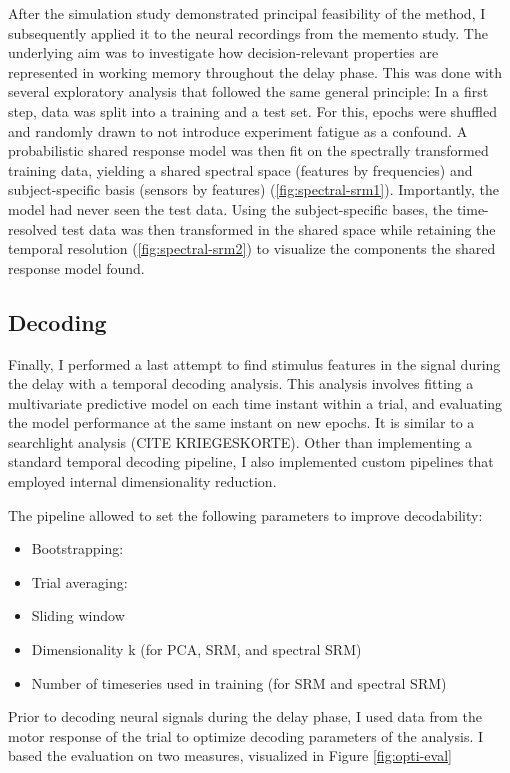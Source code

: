 After the simulation study demonstrated principal feasibility of the method, I subsequently applied it to the neural recordings from the memento study.
The underlying aim was to investigate how decision-relevant properties are represented in working memory throughout the delay phase.
This was done with several exploratory analysis that followed the same general principle:
In a first step, data was split into a training and a test set.
For this, epochs were shuffled and randomly drawn to not introduce experiment fatigue as a confound.
A probabilistic shared response model was then fit on the spectrally transformed training data, yielding a shared spectral space (features by frequencies) and subject-specific basis (sensors by features) (\ref{fig:spectral-srm1}).
Importantly, the model had never seen the test data.
Using the subject-specific bases, the time-resolved test data was then transformed in the shared space while retaining the temporal resolution (\ref{fig:spectral-srm2}) to visualize the components the shared response model found.

\subsection{Decoding}
\label{decoding-analysis}

Finally, I performed a last attempt to find stimulus features in the signal during the delay with a temporal decoding analysis.
This analysis involves fitting a multivariate predictive model on each time instant within a trial, and evaluating the model performance at the same instant on new epochs.
It is similar to a searchlight analysis (CITE KRIEGESKORTE).
Other than implementing a standard temporal decoding pipeline, I also implemented custom pipelines that employed internal dimensionality reduction.

The pipeline allowed to set the following parameters to improve decodability:
\begin{itemize}
	\item Bootstrapping:
	\item Trial averaging:
	\item Sliding window
	\item Dimensionality k (for PCA, SRM, and spectral SRM)
	\item Number of timeseries used in training (for SRM and spectral SRM)
\end{itemize}

Prior to decoding neural signals during the delay phase, I used data from the motor response of the trial to optimize decoding parameters of the analysis.
I based the evaluation on two measures, visualized in Figure \ref{fig:opti-eval}

